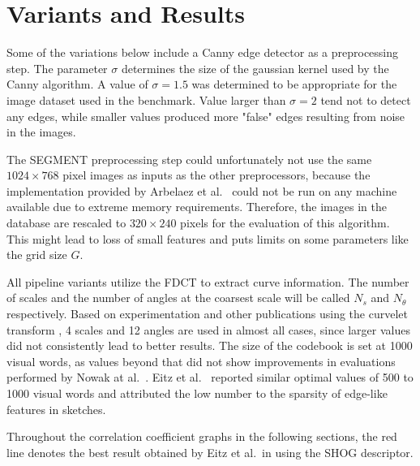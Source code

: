 \section{Variants and Results}\label{sec:results}

Some of the variations below include a Canny edge detector as a preprocessing
step. The parameter $\sigma$ determines the size of the gaussian kernel used by
the Canny algorithm. A value of $\sigma = 1.5$ was determined to be appropriate
for the image dataset used in the benchmark. Value larger than $\sigma = 2$
tend not to detect any edges, while smaller values produced more "false" edges
resulting from noise in the images.

The SEGMENT preprocessing step could unfortunately not use the same $1024
\times 768$ pixel images as inputs as the other preprocessors, because the
implementation provided by Arbelaez et al.\ \autocite{arbelaez_contour_2011}
could not be run on any machine available due to extreme memory requirements.
Therefore, the images in the database are rescaled to $320 \times 240$ pixels
for the evaluation of this algorithm. This might lead to loss of small features
    and puts limits on some parameters like the grid size $G$.

All pipeline variants utilize the FDCT to extract curve information. The number
of scales and the number of angles at the coarsest scale will be called $N_s$
and $N_{\theta}$ respectively. Based on experimentation and other publications
using the curvelet transform \autocite{mandal_curvelet_2009}
\autocite{guha_curvelet_????}, 4 scales and 12 angles are used in almost all
cases, since larger values did not consistently lead to better results. The
size of the codebook is set at 1000 visual words, as values beyond that did
not show improvements in evaluations performed by Nowak at al.\
\autocite{nowak_sampling_2006}. Eitz et al.\ \autocite{eitz_sketch-based_2010}
reported similar optimal values of 500 to 1000 visual words and attributed the
low number to the sparsity of edge-like features in sketches.

Throughout the correlation coefficient graphs in the following sections, the
red line denotes the best result obtained by Eitz et al.\ in
\autocite{eitz_sketch-based_2010} using the SHOG descriptor.





